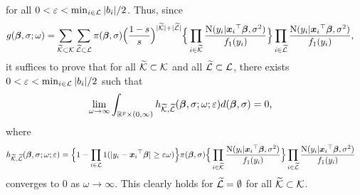 \documentclass[12pt]{article}
\def\ep{{\varepsilon}}
\def\si{{\sigma}}
\def\ep{{\varepsilon}}
\def\si{{\sigma}}
\def\om{{\omega}}
\def\non{{\nonumber}}
\def\Lc{{\cal L}}
\def\Kc{{\cal K}}
\def\ep{{\varepsilon}}
\def\si{{\sigma}}
\def\om{{\omega}}
\def\bbe{{\text{\boldmath $\beta$}}}
\def\x{{\text{\boldmath $x$}}}
\def\Lc{{\cal L}}
\def\Kc{{\cal K}}
\def\non{{\nonumber}}
\begin{document}
for all $0 < \ep < \min_{i \in \Lc } | b_i | / 2$. 
Thus, since 
\begin{align}
g( \bbe , \si ; \om ) %
&= \sum_{\widetilde{\Kc } \subset \Kc } \sum_{\widetilde{\Lc } \subset \Lc } \pi ( \bbe , \si ) \Big( {1 - s \over s} \Big) ^{| \widetilde{\Kc } | + | \widetilde{\Lc } |} \Big\{ \prod_{i \in \widetilde{\Kc }} {{\rm{N}} ( y_i | {\x _i}^{\top } \bbe , \si ^2 ) \over f_1 ( y_i )} \Big\} \prod_{i \in \widetilde{\Lc }} {{\rm{N}} ( y_i | {\x _i}^{\top } \bbe , \si ^2 ) \over f_1 ( y_i )} \text{,} \non 
\end{align}
it suffices to prove that for all $\widetilde{\Kc } \subset \Kc $ and all $\widetilde{\Lc } \subset \Lc $, there exists $0 < \ep < \min_{i \in \Lc } | b_i | / 2$ such that 
\begin{align}
&\lim_{\om \to \infty } \int_{\mathbb{R} ^p \times (0, \infty )} h_{\widetilde{\Kc } , \widetilde{\Lc }} ( \bbe , \si ; \om ; \ep ) d( \bbe , \si ) = 0 \text{,} \non 
\end{align}
where 
\begin{align}
h_{\widetilde{\Kc } , \widetilde{\Lc }} ( \bbe , \si ; \om ; \ep ) &= \Big\{ 1 - \prod_{i \in \Lc } 1(| y_i - {\x _i}^{\top } \bbe | \ge \ep \om ) \Big\} \pi ( \bbe , \si ) \Big\{ \prod_{i \in \widetilde{\Kc }} {{\rm{N}} ( y_i | {\x _i}^{\top } \bbe , \si ^2 ) \over f_1 ( y_i )} \Big\} \prod_{i \in \widetilde{\Lc }} {{\rm{N}} ( y_i | {\x _i}^{\top } \bbe , \si ^2 ) \over f_1 ( y_i )} \non 
\end{align}
converges to $0$ as $\om \to \infty $. 
This clearly holds for $\widetilde{\Lc } = \emptyset $ for all $\widetilde{\Kc } \subset \Kc $. 
\end{document}
